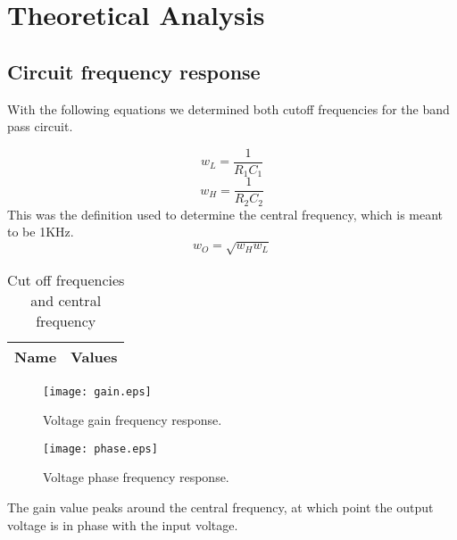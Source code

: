 \section{Theoretical Analysis}
\label{sec:analysis}
\subsection{Circuit frequency response}
With the following equations we determined both cutoff frequencies for the band pass circuit. 

\begin{equation}
w_L=\frac{1}{R_{1}C_{1}}
\end{equation}
\begin{equation}
w_H=\frac{1}{R_{2}C_{2}}
\end{equation}
This was the definition used to determine the central frequency, which is meant to be 1KHz.
\begin{equation}
w_O=\sqrt{w_{H}w_{L}}
\end{equation}

\begin{table}[h!]
  \centering
  \begin{tabular}{|l|r|}
    \hline    
    {\bf Name} & {\bf Values} \\ \hline
     
  \end{tabular}
  \caption{Cut off frequencies and central frequency}
  \label{tab:data}
\end{table}

\begin{figure}[h!] \centering
\texttt{[image: gain.eps]}
\caption{Voltage gain frequency response.}
\label{fig:gainfreq}
\end{figure}

\begin{figure}[h!] \centering
\texttt{[image: phase.eps]}
\caption{Voltage phase frequency response.}
\label{fig:gainfreq}
\end{figure}
The gain value peaks around the central frequency, at which point the output voltage is in phase with the input voltage.
\pagebreak
